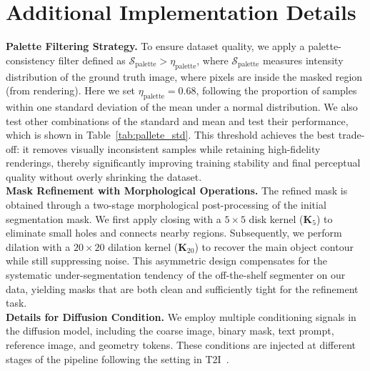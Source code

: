 \clearpage
\setcounter{page}{1}
\maketitlesupplementary

\renewcommand{\thefigure}{S\arabic{figure}}
\setcounter{figure}{0}
\renewcommand{\thetable}{S\arabic{table}}
\setcounter{table}{0}
\renewcommand{\thesection}{\Alph{section}}
\setcounter{section}{0}

\section{Additional Implementation Details}

\noindent\textbf{Palette Filtering Strategy.}
To ensure dataset quality, we apply a palette-consistency filter defined as $\mathcal{S}_{\text{palette}} > \eta_{\text{palette}}$, where $\mathcal{S}_{\text{palette}}$ measures intensity distribution of the ground truth image, where pixels are inside the masked region (from rendering). Here we set $\eta_{\text{palette}} = 0.68$, following the proportion of samples within one standard deviation of the mean under a normal distribution. We also test other combinations of the standard and mean and test their performance, which is shown in Table~\ref{tab:pallete_std}. This threshold achieves the best trade-off: it removes visually inconsistent samples while retaining high-fidelity renderings, thereby significantly improving training stability and final perceptual quality without overly shrinking the dataset.
\\

\noindent\textbf{Mask Refinement with Morphological Operations.}
The refined mask is obtained through a two-stage morphological post-processing of the initial segmentation mask. 
We first apply closing with a $5 \times 5$ disk kernel ($\mathbf{K}_{5}$) to eliminate small holes and connects nearby regions. 
Subsequently, we perform dilation with a $20 \times 20$ dilation kernel ($\mathbf{K}_{20}$) to recover the main object contour while still suppressing noise. 
This asymmetric design compensates for the systematic under-segmentation tendency of the off-the-shelf segmenter on our data, yielding masks that are both clean and sufficiently tight for the refinement task.
\\

\noindent\textbf{Details for Diffusion Condition.}
We employ multiple conditioning signals in the diffusion model, including the coarse image, binary mask, text prompt, reference image, and geometry tokens. These conditions are injected at different stages of the pipeline following the setting in T2I~\cite{mou2024t2i}.
\\

